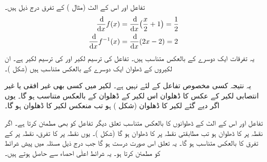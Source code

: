 تفاعل   اور اس کے الٹ  (مثال ) کے تفرق درج ذیل ہیں۔
\begin{align*}
\frac{\dif}{\dif x}f(x)&=\frac{\dif}{\dif x}\big(\frac{x}{2}+1\big)=\frac{1}{2}\\
\frac{\dif}{\dif x}f^{-1}(x)&=\frac{\dif}{\dif x}(2x-2)=2
\end{align*}
یہ تفرقات ایک دوسرے کے بالعکس متناسب ہیں۔ تفاعل  کی ترسیم لکیر  اور  کی ترسیم لکیر  ہے۔ ان لکیروں کے ڈھلوان ایک دوسرے کے بالعکس متناسب ہیں (شکل )۔

یہ نتیجہ کسی مخصوص تفاعل کے لئے نہیں ہے۔ لکیر  میں کسی بھی غیر افقی یا غیر انتصابی لکیر کے عکس کا ڈھلوان اس لکیر کے ڈھلوان کے بالعکس متناسب ہو گا۔ یوں اگر دیے گئے لکیر کا ڈھلوان  (شکل ) ہو تب منعکس لکیر کا ڈھلوان  ہو گا۔ 

تفاعل اور اس کے الٹ کے ڈھلوانوں  کا بالعکس متناسب تعلق دیگر تفاعل کو بھی مطمئن کرتا ہے۔ اگر نقطہ  پر  کا ڈھلوان  ہو تب مطابقتی نقطہ  پر  کا ڈھلوان  ہو گا (شکل )۔ یوں نقطہ  پر  کا تفرق، نقطہ  پر  کے تفرق کا بالعکس متناسب ہو گا۔ یہ تعلق اس صورت درست ہو گا جب  درج ذیل مسئلہ میں پیش   شرائط کو مطمئن کرتا ہو۔ یہ شرائط اعلٰی احصاء سے حاصل ہوتے ہیں۔ 

